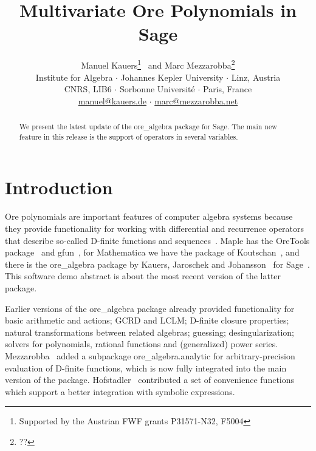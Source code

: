 \documentclass[11pt]{article}
\begin{document}
\title{Multivariate Ore Polynomials in Sage}

\author{%
  Manuel Kauers\footnote{Supported by the Austrian FWF grants P31571-N32, F5004} \
  and Marc Mezzarobba\footnote{??}\\[\medskipamount]
  Institute for Algebra $\cdot$ Johannes Kepler University $\cdot$ Linz, Austria\\
  CNRS, LIB6 $\cdot$ Sorbonne Universit\'e $\cdot$ Paris, France\\[\medskipamount]
  \url{manuel@kauers.de} $\cdot$ \url{marc@mezzarobba.net}
}

\date{}

\maketitle

\begin{abstract}
  We present the latest update of the ore\_algebra package for Sage.
  The main new feature in this release is the support of operators in several variables.
\end{abstract}

\section{Introduction}

Ore polynomials are important features of computer algebra systems because they provide
functionality for working with differential and recurrence operators that describe
so-called D-finite functions and sequences~\cite{stanley80,kauers10j,kauers13}. Maple has
the OreTools package~\cite{abramov03} and gfun~\cite{salvy94}, for Mathematica we have
the package of Koutschan~\cite{koutschan10c},
and there is the ore\_algebra package by Kauers, Jaroschek and Johansson~\cite{kauers14b} for
Sage~\cite{zimmermann18}. This software demo abstract is about the most recent version of the
latter package.

Earlier versions of the ore\_algebra package already provided functionality for basic arithmetic
and actions; GCRD and LCLM; D-finite closure properties; natural transformations between related
algebras; guessing; desingularization; solvers for polynomials, rational functions and (generalized)
power series. Mezzarobba~\cite{mezzarobba16} added a subpackage ore\_algebra.analytic for arbitrary-precision
evaluation of D-finite functions, which is now fully integrated into the main version of the package.
Hofstadler~\cite{hofstadler19} contributed a set of convenience functions which support a better integration
with symbolic expressions.
\end{document}
